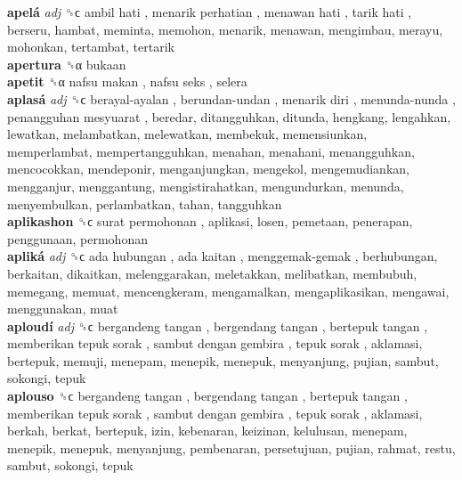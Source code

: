 \textbf{apelá} \emph{adj}  ␝ϲ   ambil hati ,  menarik perhatian ,  menawan hati ,  tarik hati , berseru, hambat, meminta, memohon, menarik, menawan, mengimbau, merayu, mohonkan, tertambat, tertarik  \\
\textbf{apertura} ␝α  bukaan  \\
\textbf{apetit} ␝α   nafsu makan ,  nafsu seks , selera  \\
\textbf{aplasá} \emph{adj}  ␝ϲ   berayal-ayalan ,  berundan-undan ,  menarik diri ,  menunda-nunda ,  penangguhan mesyuarat , beredar, ditangguhkan, ditunda, hengkang, lengahkan, lewatkan, melambatkan, melewatkan, membekuk, memensiunkan, memperlambat, mempertangguhkan, menahan, menahani, menangguhkan, mencocokkan, mendeponir, menganjungkan, mengekol, mengemudiankan, mengganjur, menggantung, mengistirahatkan, mengundurkan, menunda, menyembulkan, perlambatkan, tahan, tangguhkan  \\
\textbf{aplikashon} ␝ϲ   surat permohonan , aplikasi, losen, pemetaan, penerapan, penggunaan, permohonan  \\
\textbf{apliká} \emph{adj}  ␝ϲ   ada hubungan ,  ada kaitan ,  menggemak-gemak , berhubungan, berkaitan, dikaitkan, melenggarakan, meletakkan, melibatkan, membubuh, memegang, memuat, mencengkeram, mengamalkan, mengaplikasikan, mengawai, menggunakan, muat  \\
\textbf{aploudí} \emph{adj}  ␝ϲ   bergandeng tangan ,  bergendang tangan ,  bertepuk tangan ,  memberikan tepuk sorak ,  sambut dengan gembira ,  tepuk sorak , aklamasi, bertepuk, memuji, menepam, menepik, menepuk, menyanjung, pujian, sambut, sokongi, tepuk  \\
\textbf{aplouso} ␝ϲ   bergandeng tangan ,  bergendang tangan ,  bertepuk tangan ,  memberikan tepuk sorak ,  sambut dengan gembira ,  tepuk sorak , aklamasi, berkah, berkat, bertepuk, izin, kebenaran, keizinan, kelulusan, menepam, menepik, menepuk, menyanjung, pembenaran, persetujuan, pujian, rahmat, restu, sambut, sokongi, tepuk  \\
